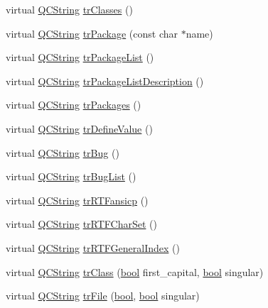 \begin{DoxyCompactItemize}
\item 
virtual \hyperlink{class_q_c_string}{Q\+C\+String} \hyperlink{class_translator_persian_a41e5c2860a2f73546b9ce407472bac14}{tr\+Classes} ()
\item 
virtual \hyperlink{class_q_c_string}{Q\+C\+String} \hyperlink{class_translator_persian_aeb04cef2e2dd44848d1a12987f6df7e5}{tr\+Package} (const char $\ast$name)
\item 
virtual \hyperlink{class_q_c_string}{Q\+C\+String} \hyperlink{class_translator_persian_ab1f6a19166bde63307a56d6cad2f5d20}{tr\+Package\+List} ()
\item 
virtual \hyperlink{class_q_c_string}{Q\+C\+String} \hyperlink{class_translator_persian_ab069ed7ed8bd3627485d4ad631f164bb}{tr\+Package\+List\+Description} ()
\item 
virtual \hyperlink{class_q_c_string}{Q\+C\+String} \hyperlink{class_translator_persian_a5b382c85a1e0df2b09a9c35f3fcdb29d}{tr\+Packages} ()
\item 
virtual \hyperlink{class_q_c_string}{Q\+C\+String} \hyperlink{class_translator_persian_a22e2b9347519495efc24b78d3fe811ee}{tr\+Define\+Value} ()
\item 
virtual \hyperlink{class_q_c_string}{Q\+C\+String} \hyperlink{class_translator_persian_a2109e7fbe5a39211e8fa6b4ba46212b8}{tr\+Bug} ()
\item 
virtual \hyperlink{class_q_c_string}{Q\+C\+String} \hyperlink{class_translator_persian_aa14e866e1bf12f10fe27e2a9037810d0}{tr\+Bug\+List} ()
\item 
virtual \hyperlink{class_q_c_string}{Q\+C\+String} \hyperlink{class_translator_persian_a726bd8cac1d4e5623e5538b522c1bf31}{tr\+R\+T\+Fansicp} ()
\item 
virtual \hyperlink{class_q_c_string}{Q\+C\+String} \hyperlink{class_translator_persian_a25e7ec74ce148545edb8fc74c098c7b9}{tr\+R\+T\+F\+Char\+Set} ()
\item 
virtual \hyperlink{class_q_c_string}{Q\+C\+String} \hyperlink{class_translator_persian_a554a8ee5a92be3505a476b5288e89de5}{tr\+R\+T\+F\+General\+Index} ()
\item 
virtual \hyperlink{class_q_c_string}{Q\+C\+String} \hyperlink{class_translator_persian_aca05419884ed135f61766579a00bf85c}{tr\+Class} (\hyperlink{qglobal_8h_a1062901a7428fdd9c7f180f5e01ea056}{bool} first\+\_\+capital, \hyperlink{qglobal_8h_a1062901a7428fdd9c7f180f5e01ea056}{bool} singular)
\item 
virtual \hyperlink{class_q_c_string}{Q\+C\+String} \hyperlink{class_translator_persian_ae1ba6330d764c7b59e269630592b9528}{tr\+File} (\hyperlink{qglobal_8h_a1062901a7428fdd9c7f180f5e01ea056}{bool}, \hyperlink{qglobal_8h_a1062901a7428fdd9c7f180f5e01ea056}{bool} singular)

\end{DoxyCompactItemize}
